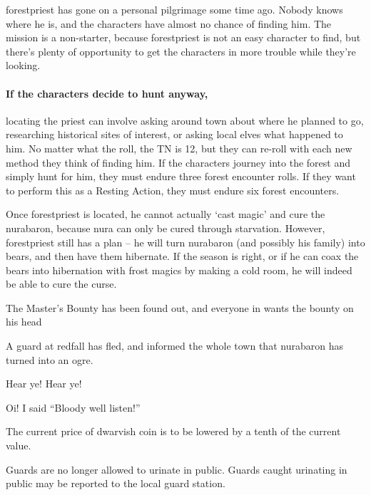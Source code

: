 \begin{multicols}{2}
\begin{speechtext}
\end{speechtext}

\Gls{forestpriest} has gone on a personal pilgrimage some time ago.
Nobody knows where he is, and the characters have almost no chance of finding him.
The mission is a non-starter, because \gls{forestpriest} is not an easy character to find, but there's plenty of opportunity to get the characters in more trouble while they're looking.

\paragraph{If the characters decide to hunt anyway,}
locating the priest can involve asking around \gls{town} about where he planned to go, researching historical sites of interest, or asking local elves what happened to him.
No matter what the roll, the TN is 12, but they can re-roll with each new method they think of finding him.
If the characters journey into the forest and simply hunt for him, they must endure three forest encounter rolls.
If they want to perform this as a Resting Action, they must endure six forest encounters.

Once \gls{forestpriest} is located, he cannot actually `cast magic' and cure the \gls{nurabaron}, because nura can only be cured through starvation.
However, \gls{forestpriest} still has a plan -- he will turn \gls{nurabaron} (and possibly his family) into bears, and then have them hibernate.
If the season is right, or if he can coax the bears into hibernation with frost magics by making a cold room, he will indeed be able to cure the curse.


{\N \N The Master's Bounty}%
{ has been found out, and everyone in  wants the bounty on his head}%

A guard at \gls{redfall} has fled, and informed the whole town that \gls{nurabaron} has turned into an ogre.

\begin{speechtext}

		Hear ye! Hear ye!

		Oi! I said ``Bloody well listen!''

		The current price of dwarvish coin is to be lowered by a tenth of the current value.

		Guards are no longer allowed to urinate in public.
		Guards caught urinating in public may be reported to the local guard station.


\end{speechtext}
\end{multicols}

